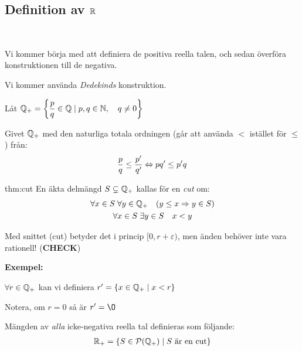 \subsection{Definition av $\mathbb{R}$}\hfill\\\par
\noindent Vi kommer börja med att definiera de positiva reella talen, och sedan överföra konstruktionen till de negativa.
\par\bigskip
\noindent Vi kommer använda \textit{Dedekinds} konstruktion.
\par\bigskip
\noindent Låt $\mathbb{Q}_+ = \left\{\dfrac{p}{q}\in\mathbb{Q}\;|\;p,q\in\mathbb{N},\quad q\neq0\right\}$\par
\noindent Givet $\mathbb{Q}_+$ med den naturliga totala ordningen (går att använda $<$ istället för $\leq$) från:
\begin{equation*}
  \begin{gathered}
    \dfrac{p}{q}\leq \dfrac{p^{\prime}}{q^{\prime}}\Leftrightarrow pq^{\prime}\leq p^{\prime}q
  \end{gathered}
\end{equation*}
\par\bigskip
\begin{theo}[Cut]{thm:cut}
  En äkta delmängd $S\subsetneq \mathbb{Q}_+$ kallas för en \textit{cut} om:
  \begin{equation*}
    \begin{gathered}
      \forall x\in S\;\forall y\in \mathbb{Q}_+\quad (y\leq x\Rightarrow y\in S)\\
      \forall x\in S\;\exists y\in S\quad x<y
    \end{gathered}
  \end{equation*}
\end{theo}
\par\bigskip
\noindent Med snittet (cut) betyder det i princip $[0,r+\varepsilon)$, men änden behöver inte vara rationell! (\textbf{CHECK})
\par\bigskip
\noindent\textbf{Exempel:}\par
\noindent $\forall r\in\mathbb{Q}_+$ kan vi definiera $r^{\prime} = \left\{x\in\mathbb{Q}_+\;|\; x<r\right\}$\par
\noindent Notera, om $r =0$ så är $r^{\prime}=\O$
\par\bigskip
\begin{theo}
  Mängden av \textit{alla} icke-negativa reella tal definieras som följande:
  \begin{equation*}
    \begin{gathered}
      \mathbb{R}_+ = \left\{S\in\mathcal{P}(\mathbb{Q}_+)\;|\;S\text{ är en cut}\right\}
    \end{gathered}
  \end{equation*}
\end{theo}
